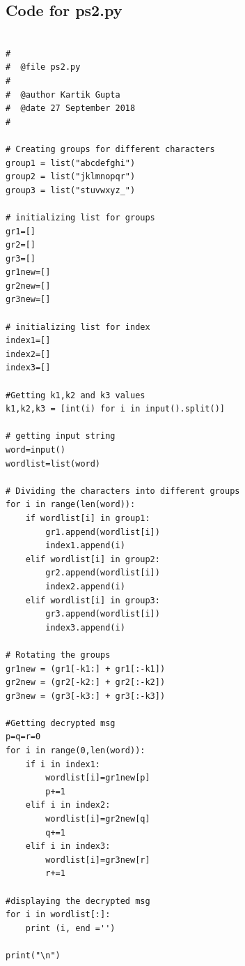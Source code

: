 \documentclass[12pt]{article}
\begin{document}
\subsection{Code for ps2.py}
\begin{lstlisting}[style=CStyle]

#
#  @file ps2.py
#
#  @author Kartik Gupta
#  @date 27 September 2018
#

# Creating groups for different characters
group1 = list("abcdefghi")
group2 = list("jklmnopqr")
group3 = list("stuvwxyz_")

# initializing list for groups
gr1=[]
gr2=[]
gr3=[]
gr1new=[]
gr2new=[]
gr3new=[]

# initializing list for index
index1=[]
index2=[]
index3=[]

#Getting k1,k2 and k3 values
k1,k2,k3 = [int(i) for i in input().split()]

# getting input string
word=input()
wordlist=list(word)

# Dividing the characters into different groups
for i in range(len(word)):
    if wordlist[i] in group1:
        gr1.append(wordlist[i])
        index1.append(i)
    elif wordlist[i] in group2:
        gr2.append(wordlist[i])
        index2.append(i)
    elif wordlist[i] in group3:
        gr3.append(wordlist[i])
        index3.append(i)

# Rotating the groups
gr1new = (gr1[-k1:] + gr1[:-k1])
gr2new = (gr2[-k2:] + gr2[:-k2])
gr3new = (gr3[-k3:] + gr3[:-k3])

#Getting decrypted msg
p=q=r=0
for i in range(0,len(word)):
    if i in index1:
        wordlist[i]=gr1new[p]
        p+=1
    elif i in index2:
        wordlist[i]=gr2new[q]
        q+=1
    elif i in index3:
        wordlist[i]=gr3new[r]
        r+=1

#displaying the decrypted msg
for i in wordlist[:]:
    print (i, end ='')
    
print("\n")



\end{lstlisting}





\newpage


\nocite{*}




     
\end{document}
